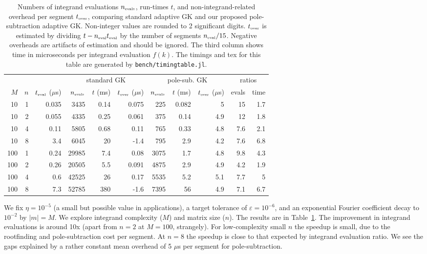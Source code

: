 \documentclass[11pt]{article}
\newcommand{\ca}[2]{\caption{#1 \label{#2}}}
\newcommand{\tbox}[1]{{\mbox{\tiny #1}}}
\newcommand{\eps}{\varepsilon}
\begin{document}
\begin{table}   %
  \centering
\begin{tabular}{r|r|r|rrr|rrr|rr|}
&&& \multicolumn{3}{c}{standard GK} & \multicolumn{3}{c}{pole-sub. GK} & \multicolumn{2}{c}{ratios}\\ 
$M$ & $n$ & $t_\tbox{eval}$ ($\mu$s) & $n_\tbox{evals}$ & $t$ (ms) & $t_\tbox{over}$ ($\mu$s) & $n_\tbox{evals}$ & $t$ (ms) & $t_\tbox{over}$ ($\mu$s) & evals & time\\ 
\hline
10 & 1 & 0.035 & 3435 & 0.14 & 0.075 & 225 & 0.082 & 5 & 15 & 1.7\\ 
10 & 2 & 0.055 & 4335 & 0.25 & 0.061 & 375 & 0.14 & 4.9 & 12 & 1.8\\ 
10 & 4 & 0.11 & 5805 & 0.68 & 0.11 & 765 & 0.33 & 4.8 & 7.6 & 2.1\\ 
10 & 8 & 3.4 & 6045 & 20 & -1.4 & 795 & 2.9 & 4.2 & 7.6 & 6.8\\ 
\hline
100 & 1 & 0.24 & 29985 & 7.4 & 0.08 & 3075 & 1.7 & 4.8 & 9.8 & 4.3\\ 
100 & 2 & 0.26 & 20505 & 5.5 & 0.091 & 4875 & 2.9 & 4.9 & 4.2 & 1.9\\ 
100 & 4 & 0.6 & 42525 & 26 & 0.17 & 5535 & 5.2 & 5.1 & 7.7 & 5\\ 
100 & 8 & 7.3 & 52785 & 380 & -1.6 & 7395 & 56 & 4.9 & 7.1 & 6.7\\ 
\hline
\end{tabular}
\ca{Numbers of integrand evaluations $n_\tbox{evals}$, run-times $t$,
  and non-integrand-related overhead per segment $t_\tbox{over}$, comparing
  standard adaptive GK and our proposed pole-subtraction adaptive GK.
  Non-integer values are rounded to 2 significant digits.
  $t_\tbox{over}$ is estimated by dividing $t - n_\tbox{eval}t_\tbox{eval}$ by
  the number of segments $n_\tbox{eval}/15$.
  Negative overheads are artifacts of estimation and should be ignored.
  The third column shows time in microseconds per integrand evaluation $f(k)$.
The timings and tex for this table are generated by {\tt bench/timingtable.jl}.
}{t:time}
\end{table}

We fix $\eta=10^{-5}$ (a small but possible value in applications),
a target tolerance of $\eps=10^{-6}$,
and an exponential Fourier coefficient decay to $10^{-2}$ by $|m|=M$.
We explore integrand complexity ($M$) and matrix size ($n$).
The results are in Table~\ref{t:time}.
The improvement in integrand evaluations is around 10x (apart from $n=2$ at $M=100$,
strangely).
For low-complexity small $n$ the speedup is small,
due to the rootfinding and pole-subtraction cost per segment.
At $n=8$ the speedup is close to that expected by integrand evaluation ratio.
We see the gaps explained by a rather constant mean overhead of 5 $\mu$s per segment
for pole-subtraction.
\end{document}
